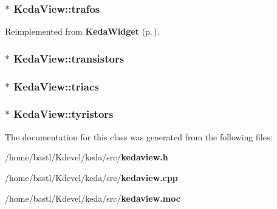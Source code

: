 \subsubsection{ $\ast$ {\bf Keda\-View::trafos}}\label{classKedaView_cc50694e7f83c0ae0893748ea6da5f59}




Reimplemented from {\bf Keda\-Widget} {\rm (p.\,\pageref{classKedaWidget_cc50694e7f83c0ae0893748ea6da5f59})}.
\subsubsection{ $\ast$ {\bf Keda\-View::transistors}}\label{classKedaView_ff750796e6ff1fb40d6a8248a6485dc3}


\subsubsection{ $\ast$ {\bf Keda\-View::triacs}}\label{classKedaView_569e25e22a19c874e250c6c041b16f40}


\subsubsection{ $\ast$ {\bf Keda\-View::tyristors}}\label{classKedaView_68d2b8e9f08c565a5a790ef5647bf776}




The documentation for this class was generated from the following files:\begin{CompactItemize}
\item 
/home/bastl/Kdevel/keda/src/{\bf kedaview.h}\item 
/home/bastl/Kdevel/keda/src/{\bf kedaview.cpp}\item 
/home/bastl/Kdevel/keda/src/{\bf kedaview.moc}\end{CompactItemize}
